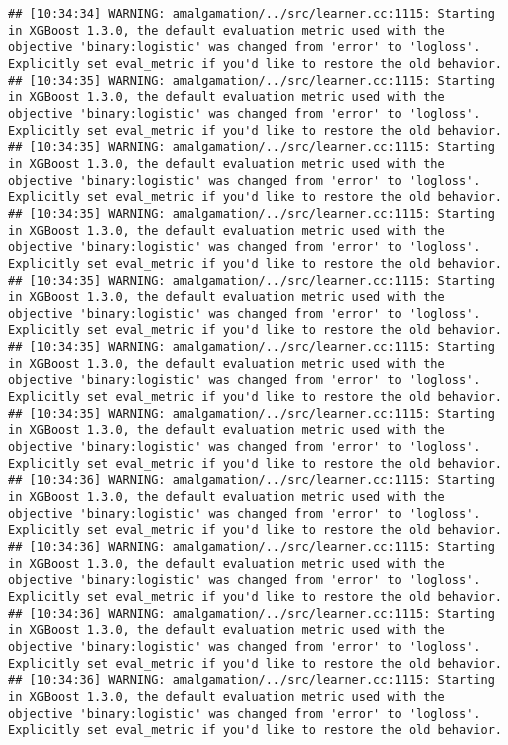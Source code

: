 \documentclass[
]{scrbook}
\begin{document}
\begin{verbatim}
## [10:34:34] WARNING: amalgamation/../src/learner.cc:1115: Starting in XGBoost 1.3.0, the default evaluation metric used with the objective 'binary:logistic' was changed from 'error' to 'logloss'. Explicitly set eval_metric if you'd like to restore the old behavior.
## [10:34:35] WARNING: amalgamation/../src/learner.cc:1115: Starting in XGBoost 1.3.0, the default evaluation metric used with the objective 'binary:logistic' was changed from 'error' to 'logloss'. Explicitly set eval_metric if you'd like to restore the old behavior.
## [10:34:35] WARNING: amalgamation/../src/learner.cc:1115: Starting in XGBoost 1.3.0, the default evaluation metric used with the objective 'binary:logistic' was changed from 'error' to 'logloss'. Explicitly set eval_metric if you'd like to restore the old behavior.
## [10:34:35] WARNING: amalgamation/../src/learner.cc:1115: Starting in XGBoost 1.3.0, the default evaluation metric used with the objective 'binary:logistic' was changed from 'error' to 'logloss'. Explicitly set eval_metric if you'd like to restore the old behavior.
## [10:34:35] WARNING: amalgamation/../src/learner.cc:1115: Starting in XGBoost 1.3.0, the default evaluation metric used with the objective 'binary:logistic' was changed from 'error' to 'logloss'. Explicitly set eval_metric if you'd like to restore the old behavior.
## [10:34:35] WARNING: amalgamation/../src/learner.cc:1115: Starting in XGBoost 1.3.0, the default evaluation metric used with the objective 'binary:logistic' was changed from 'error' to 'logloss'. Explicitly set eval_metric if you'd like to restore the old behavior.
## [10:34:35] WARNING: amalgamation/../src/learner.cc:1115: Starting in XGBoost 1.3.0, the default evaluation metric used with the objective 'binary:logistic' was changed from 'error' to 'logloss'. Explicitly set eval_metric if you'd like to restore the old behavior.
## [10:34:36] WARNING: amalgamation/../src/learner.cc:1115: Starting in XGBoost 1.3.0, the default evaluation metric used with the objective 'binary:logistic' was changed from 'error' to 'logloss'. Explicitly set eval_metric if you'd like to restore the old behavior.
## [10:34:36] WARNING: amalgamation/../src/learner.cc:1115: Starting in XGBoost 1.3.0, the default evaluation metric used with the objective 'binary:logistic' was changed from 'error' to 'logloss'. Explicitly set eval_metric if you'd like to restore the old behavior.
## [10:34:36] WARNING: amalgamation/../src/learner.cc:1115: Starting in XGBoost 1.3.0, the default evaluation metric used with the objective 'binary:logistic' was changed from 'error' to 'logloss'. Explicitly set eval_metric if you'd like to restore the old behavior.
## [10:34:36] WARNING: amalgamation/../src/learner.cc:1115: Starting in XGBoost 1.3.0, the default evaluation metric used with the objective 'binary:logistic' was changed from 'error' to 'logloss'. Explicitly set eval_metric if you'd like to restore the old behavior.
\end{verbatim}
\end{document}
